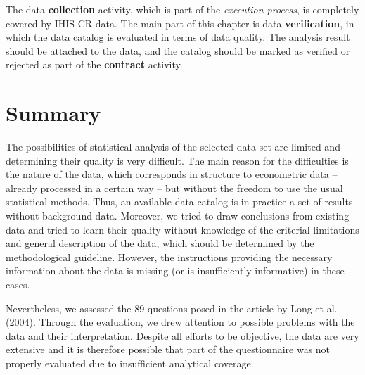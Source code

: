 The data \textbf{collection} activity, which is part of the \textit{execution process}, is completely covered by IHIS CR data.
The main part of this chapter is data \textbf{verification}, in which the data catalog is evaluated in terms of data quality.
The analysis result should be attached to the data, and the catalog should be marked as verified or rejected as part of the \textbf{contract} activity.

\section{Summary}

The possibilities of statistical analysis of the selected data set are limited and determining their quality is very difficult.
The main reason for the difficulties is the nature of the data, which corresponds in structure to econometric data – already processed in a certain way – but without the freedom to use the usual statistical methods.
Thus, an available data catalog is in practice a set of results without background data.
Moreover, we tried to draw conclusions from existing data and tried to learn their quality without knowledge of the criterial limitations and general description of the data, which should be determined by the methodological guideline.
However, the instructions providing the necessary information about the data is missing (or is insufficiently informative) in these cases.

Nevertheless, we assessed the 89 questions posed in the article by Long et al. (2004).
Through the evaluation, we drew attention to possible problems with the data and their interpretation.
Despite all efforts to be objective, the data are very extensive and it is therefore possible that part of the questionnaire was not properly evaluated due to insufficient analytical coverage.


